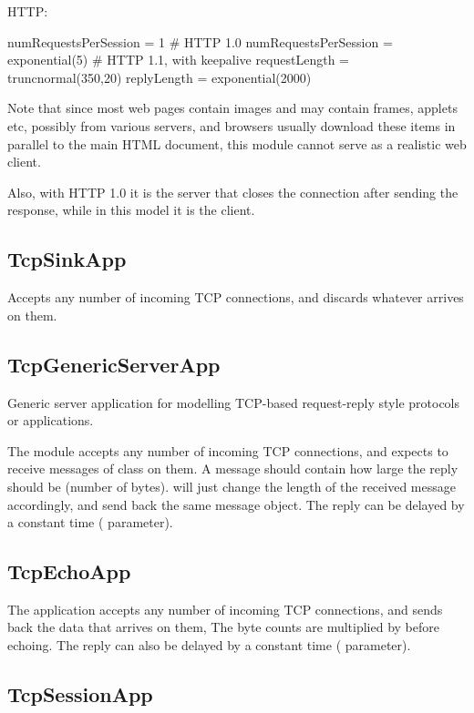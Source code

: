 HTTP:

\begin{inifile}
numRequestsPerSession = 1 # HTTP 1.0
numRequestsPerSession = exponential(5)  # HTTP 1.1, with keepalive
requestLength = truncnormal(350,20)
replyLength = exponential(2000)
\end{inifile}

Note that since most web pages contain images and may contain frames,
applets etc, possibly from various servers, and browsers usually download
these items in parallel to the main HTML document, this module cannot
serve as a realistic web client.

Also, with HTTP 1.0 it is the server that closes the connection after
sending the response, while in this model it is the client.

\subsection{TcpSinkApp}

Accepts any number of incoming TCP connections, and discards whatever
arrives on them.

\subsection{TcpGenericServerApp}

Generic server application for modelling TCP-based request-reply style
protocols or applications.

The module accepts any number of incoming TCP connections, and expects
to receive messages of class  on them. A message should
contain how large the reply should be (number of bytes). 
will just change the length of the received message accordingly, and send
back the same message object. The reply can be delayed by a constant time
( parameter).

\subsection{TcpEchoApp}

The  application accepts any number of incoming TCP
connections, and sends back the data that arrives on them, The byte counts are
multiplied by  before echoing. The reply can also be delayed by
a constant time ( parameter).

\subsection{TcpSessionApp}

